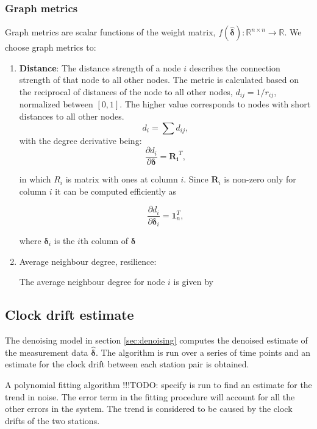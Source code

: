 \documentclass[12pt,a4paper,english]{article}
\newcommand\todo[1]{{\color{red}!!!TODO: #1}}
\begin{document}
\subsubsection{Graph metrics}
Graph metrics are scalar functions of the weight matrix, $f(\bm{\hat{\delta}}): \mathbb{R}^{n \times n}\rightarrow \mathbb{R}$. We choose graph metrics to:
\begin{enumerate}
\item \textbf{Distance}: The distance strength of a node $i$ describes the connection strength of that node to all other nodes. The metric is calculated based on the reciprocal of distances of the node to all other nodes, $d _{ij}= 1/r_{ij}$, normalized between $[0,1]$. The higher value corresponds to nodes with short distances to all other nodes. 
\begin{equation}
d_i = \sum{d_{ij}},  
\end{equation}
with the degree derivative being:
\begin{equation}
\frac{\partial d_i}{\partial \bm{\delta}}= \mathbf{R_i}^T,
\end{equation} 

in which $R_i$ is matrix with ones at column $i$. Since $\mathbf{R}_i$ is non-zero only for column $i$ it can be computed efficiently as 

\begin{equation}
\frac{\partial d_i}{\partial \bm{\delta}_i} = \mathbf{1}_n^T, 
\end{equation} 
 
where $\bm{\delta}_i$ is the $i$th column of $\bm{\delta}$
 
\item Average neighbour degree, resilience: 

The average neighbour degree for node $i$ is given by

\end{enumerate}

\subsection{Clock drift estimate}

The denoising model in section \ref{sec:denoising} computes the denoised estimate of the measurement data $\bm{\hat{\delta}}$. The algorithm is run over a series of time points and an estimate for the clock drift between each station pair is obtained. 

A polynomial fitting algorithm \todo{specify} is run to find an estimate for the trend in noise. The error term in the fitting procedure will account for all the other errors in the system. The trend is considered to be caused by the clock drifts of the two stations. 
\end{document}
